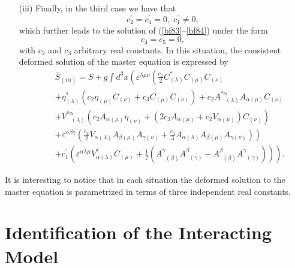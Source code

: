 \documentclass[a4paper,11pt]{article}
\begin{document}
\begin{enumerate}
\item[(iii)]  Finally, in the third case we have that
\begin{equation}
c_{2}^{\prime }=c_{4}^{\prime }=0,\;c_{1}^{\prime }\neq 0,  \label{bf92}
\end{equation}
which further leads to the solution of (\ref{bf83}--\ref{bf84}) under the
form
\begin{equation}
c_{4}=c_{5}=0,  \label{bf93}
\end{equation}
with $c_{2}$ and $c_{3}$ arbitrary real constants. In this situation, the
consistent deformed solution of the master equation is expressed by
\begin{eqnarray}
&&\bar{S}_{(iii)}=S+g\int d^{3}x\left( \varepsilon ^{\lambda \mu \nu }\left(
\frac{c_{2}}{2}C_{(\lambda )}^{*}C_{(\mu )}C_{(\nu )}\right. \right.
\nonumber \\
&&+\eta _{(\lambda )}^{*}\left( c_{2}\eta _{(\mu )}C_{(\nu )}+c_{3}C_{(\mu
)}C_{(\nu )}\right) +c_{2}A_{\;\;\;(\lambda )}^{*\alpha }A_{\alpha (\mu
)}C_{(\nu )}  \nonumber \\
&&+V_{\;\;\;(\lambda )}^{*\alpha }\left( c_{2}A_{\alpha (\mu )}\eta _{(\nu
)}+\left( 2c_{3}A_{\alpha (\mu )}+c_{2}V_{\alpha (\mu )}\right) C_{(\nu
)}\right)   \nonumber \\
&&\left. +\varepsilon ^{\alpha \beta \gamma }\left( \frac{c_{2}}{2}V_{\alpha
(\lambda )}A_{\beta (\mu )}A_{\gamma (\nu )}+\frac{c_{3}}{3}A_{\alpha
(\lambda )}A_{\beta (\mu )}A_{\gamma (\nu )}\right) \right)   \nonumber \\
&&\left. +c_{1}^{\prime }\left( \varepsilon ^{\alpha \lambda \mu }V_{\alpha
(\lambda )}^{*}C_{(\mu )}+\frac{1}{2}\left( A_{\;\;(\beta )}^{\gamma
}A_{\;\;(\gamma )}^{\beta }-A_{\;\;(\beta )}^{\beta }A_{\;\;(\gamma
)}^{\gamma }\right) \right) \right) .  \label{bf94}
\end{eqnarray}
\end{enumerate}

It is interesting to notice that in each situation the deformed solution to
the master equation is parametrized in terms of three independent real
constants.

\section{Identification of the Interacting Model}
\end{document}
